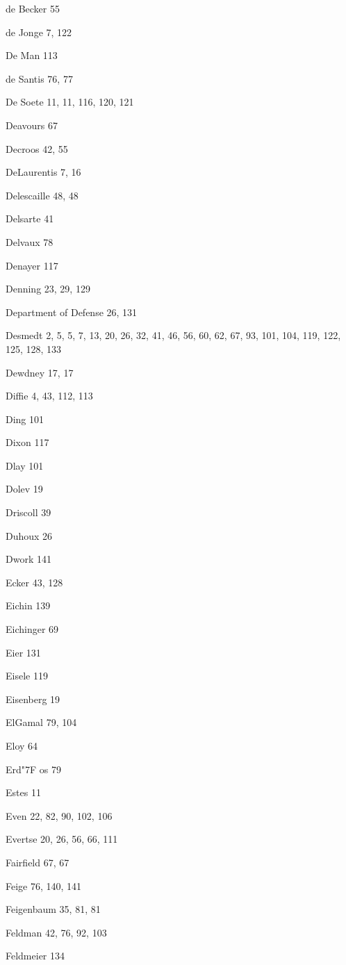 \begin{theindex}
\item {de Becker} 55
\item {de Jonge} 7, 122
\item {De Man} 113
\item {de Santis} 76, 77
\item {De Soete} 11, 11, 116, 120, 121
\item Deavours 67
\item Decroos 42, 55
\item DeLaurentis 7, 16
\item Delescaille 48, 48
\item Delsarte 41
\item Delvaux 78
\item Denayer 117
\item Denning 23, 29, 129
\item {Department of Defense} 26, 131
\item Desmedt 2, 5, 5, 7, 13, 20, 26, 32, 41, 46, 56, 60, 62, 67, 93, 101, 104, 119, 122, 125, 128, 133
\item Dewdney 17, 17
\item Diffie 4, 43, 112, 113
\item Ding 101
\item Dixon 117
\item Dlay 101
\item Dolev 19
\item Driscoll 39
\item Duhoux 26
\item Dwork 141
\item Ecker 43, 128
\item Eichin 139
\item Eichinger 69
\item Eier 131
\item Eisele 119
\item Eisenberg 19
\item ElGamal 79, 104
\item Eloy 64
\item Erd{\accent "7F o}s 79
\item Estes 11
\item Even 22, 82, 90, 102, 106
\item Evertse 20, 26, 56, 66, 111
\item Fairfield 67, 67
\item Feige 76, 140, 141
\item Feigenbaum 35, 81, 81
\item Feldman 42, 76, 92, 103
\item Feldmeier 134

\end{theindex}
